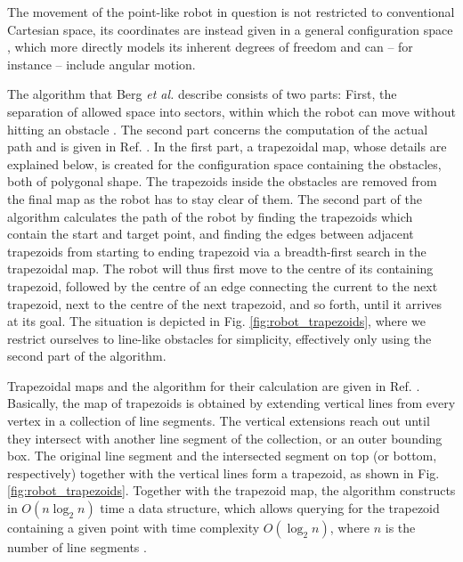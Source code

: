 The movement of the point-like robot in question is not restricted to conventional 
Cartesian space, its coordinates are instead given in a general configuration space
\cite[Ch. 13.1, pp. 284-286]{Berg2008} \cite{Choset2010_ch3}, which more directly 
models its inherent degrees of freedom and can -- for instance -- include angular motion.

The algorithm that Berg \textit{et al.} describe consists of two parts: 
First, the separation of allowed space into sectors, within which the robot can 
move without hitting an obstacle \cite[p. 286]{Berg2008}. 
The second part concerns the computation of the actual path and is given in 
Ref. \cite[p. 289]{Berg2008}. 
In the first part, a trapezoidal map, whose details are explained below, is created for the 
configuration space containing the obstacles, both of polygonal shape. 
The trapezoids inside the obstacles are removed from the final map as the robot 
has to stay clear of them. 
The second part of the algorithm calculates the path of the robot by finding 
the trapezoids which contain the start and target point, and finding the edges 
between adjacent trapezoids from starting to ending trapezoid via a breadth-first 
search in the trapezoidal map. The robot will thus first move to the centre of 
its containing trapezoid, followed by the centre of an edge connecting the current 
to the next trapezoid, next to the centre of the next trapezoid, and so forth, 
until it arrives at its goal. 
The situation is depicted in Fig. \ref{fig:robot_trapezoids}, where we restrict 
ourselves to line-like obstacles for simplicity, effectively only using the 
second part of the algorithm.

Trapezoidal maps and the algorithm for their calculation are given in Ref. 
\cite[Ch. 6, pp. 121-146]{Berg2008}. Basically, the map of trapezoids is obtained 
by extending vertical lines from every vertex in a collection of line segments. 
The vertical extensions reach out until they intersect with another line segment 
of the collection, or an outer bounding box. The original line segment and the 
intersected segment on top (or bottom, respectively) together with the vertical 
lines form a trapezoid, as shown in Fig. \ref{fig:robot_trapezoids}. 
Together with the trapezoid map, the algorithm constructs in 
$O \left(n \log_{2} n \right)$ time a data structure, which allows querying for 
the trapezoid containing a given point with time complexity $O \left( \log_{2} n \right)$, 
where $n$ is the number of line segments \cite[Theorem 6.3, p. 133]{Berg2008}.

